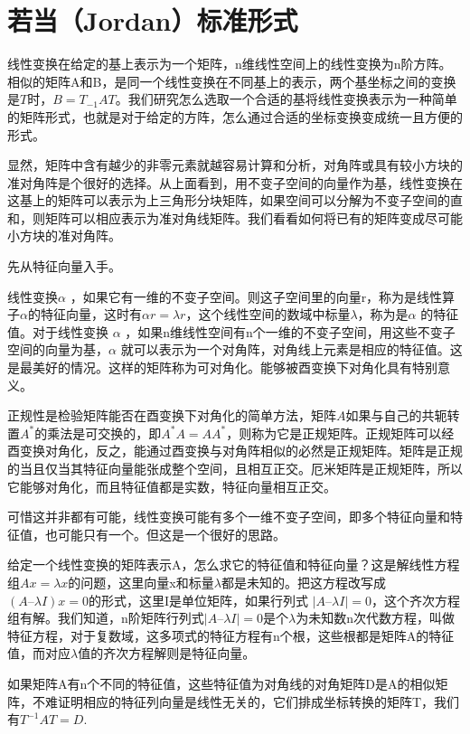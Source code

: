 	\section{若当（Jordan）标准形式}
	
	线性变换在给定的基上表示为一个矩阵，n维线性空间上的线性变换为n阶方阵。相似的矩阵A和B，是同一个线性变换在不同基上的表示，两个基坐标之间的变换是$ T $时，$ B= T_{-1}AT $。我们研究怎么选取一个合适的基将线性变换表示为一种简单的矩阵形式，也就是对于给定的方阵，怎么通过合适的坐标变换变成统一且方便的形式。
	
	显然，矩阵中含有越少的非零元素就越容易计算和分析，对角阵或具有较小方块的准对角阵是个很好的选择。从上面看到，用不变子空间的向量作为基，线性变换在这基上的矩阵可以表示为上三角形分块矩阵，如果空间可以分解为不变子空间的直和，则矩阵可以相应表示为准对角线矩阵。我们看看如何将已有的矩阵变成尽可能小方块的准对角阵。
	
	先从特征向量入手。
	
	线性变换$ \alpha $ ，如果它有一维的不变子空间。则这子空间里的向量r，称为是线性算子$ \alpha $的特征向量，这时有$  \alpha r  = \lambda r  $，这个线性空间的数域中标量$ \lambda $，称为是$ \alpha $ 的特征值。对于线性变换 $ \alpha $ ，如果n维线性空间有n个一维的不变子空间，用这些不变子空间的向量为基，$ \alpha $ 就可以表示为一个对角阵，对角线上元素是相应的特征值。这是最美好的情况。这样的矩阵称为可对角化。能够被酉变换下对角化具有特别意义。
	
	正规性是检验矩阵能否在酉变换下对角化的简单方法，矩阵$ A $如果与自己的共轭转置$ A^{*} $的乘法是可交换的，即$ A^*A  = AA^* $，则称为它是正规矩阵。正规矩阵可以经酉变换对角化，反之，能通过酉变换与对角阵相似的必然是正规矩阵。矩阵是正规的当且仅当其特征向量能张成整个空间，且相互正交。厄米矩阵是正规矩阵，所以它能够对角化，而且特征值都是实数，特征向量相互正交。
	
	可惜这并非都有可能，线性变换可能有多个一维不变子空间，即多个特征向量和特征值，也可能只有一个。但这是一个很好的思路。
	
	给定一个线性变换的矩阵表示A，怎么求它的特征值和特征向量？这是解线性方程组$ Ax=\lambda x $的问题，这里向量x和标量$ \lambda $都是未知的。把这方程改写成 $ (A – \lambda I)x = 0 $的形式，这里I是单位矩阵，如果行列式 $ |A – \lambda I| = 0 $，这个齐次方程组有解。我们知道，n阶矩阵行列式$  |A – \lambda I| = 0 $是个$ \lambda $为未知数n次代数方程，叫做特征方程，对于复数域，这多项式的特征方程有n个根，这些根都是矩阵A的特征值，而对应$ \lambda $值的齐次方程解则是特征向量。

	如果矩阵A有n个不同的特征值，这些特征值为对角线的对角矩阵D是A的相似矩阵，不难证明相应的特征列向量是线性无关的，它们排成坐标转换的矩阵T，我们有$ T^{-1}AT = D $.

